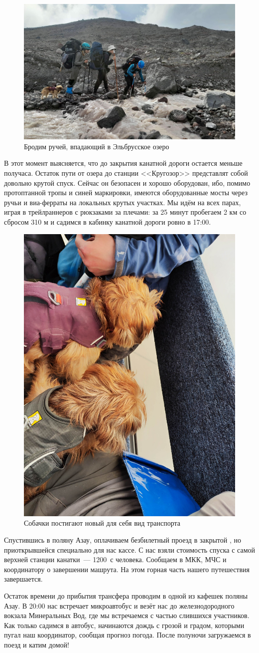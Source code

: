 \begin{figure}[h!]
	\centering
	\includegraphics[width=0.7\linewidth]{../pics/20240830_162252.jpg}
	\caption{Бродим ручей, впадающий в Эльбрусское озеро}
	\label{fig:20240830_162252.jpg}
\end{figure}

В этот момент выясняется, что до закрытия канатной дороги остается меньше получаса. Остаток пути от озера до станции <<Кругозор>> представлят собой довольно крутой спуск. Сейчас он безопасен и хорошо оборудован, ибо, помимо протоптанной тропы и синей маркировки, имеются оборудованные мосты через ручьи и виа-ферраты на локальных крутых участках. Мы идём на всех парах, играя в трейлраннеров с рюкзаками за плечами: за 25 минут пробегаем 2 км со сбросом 310 м и садимся в кабинку канатной дороги ровно в 17:00.

\begin{figure}[h!]
	\centering
	\includegraphics[width=0.4\linewidth]{../pics/IMG_20240830_170232.jpg}
	\caption{Собачки постигают новый для себя вид транспорта}
	\label{fig:IMG_20240830_170232.jpg}
\end{figure}

 Спустившись в поляну Азау, оплачиваем безбилетный проезд в закрытой , но приоткрывшейся специально для нас кассе. С нас взяли стоимость спуска с самой верхней станции канатки~--- 1200~\faRub с человека. Сообщаем в МКК, МЧС и координатору о завершении машрута. На этом горная часть нашего путешествия завершается.

Остаток времени до прибытия трансфера проводим в одной из кафешек поляны Азау.
В 20:00 нас встречает микроавтобус и везёт нас до железнодородного вокзала Минеральных Вод, где мы встречаемся с частью слившихся участников. Как только садимся в автобус, начинаются дождь с грозой и градом, которыми пугал наш координатор, сообщая прогноз погода. После полуночи загружаемся в поезд и катим домой!

\clearpage